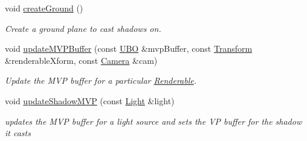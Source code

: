 \begin{DoxyCompactItemize}
\mbox{\label{class_vk_app_ab1b583e2a575aabcdb36e34d620a59ac}} 
void \mbox{\hyperlink{class_vk_app_ab1b583e2a575aabcdb36e34d620a59ac}{create\+Ground}} ()
\begin{DoxyCompactList}\small\item\em Create a ground plane to cast shadows on. \end{DoxyCompactList}\item 
void \mbox{\hyperlink{class_vk_app_a3ff7e92225ca0400b637c64082fcdfc9}{update\+M\+V\+P\+Buffer}} (const \mbox{\hyperlink{struct_u_b_o}{U\+BO}} \&mvp\+Buffer, const \mbox{\hyperlink{class_transform}{Transform}} \&renderable\+Xform, const \mbox{\hyperlink{class_camera}{Camera}} \&cam)
\begin{DoxyCompactList}\small\item\em Update the M\+VP buffer for a particular \mbox{\hyperlink{class_renderable}{Renderable}}. \end{DoxyCompactList}\item 
void \mbox{\hyperlink{class_vk_app_a0aade43db97056560fa3bc869423d1cc}{update\+Shadow\+M\+VP}} (const \mbox{\hyperlink{struct_light}{Light}} \&light)
\begin{DoxyCompactList}\small\item\em updates the M\+VP buffer for a light source and sets the VP buffer for the shadow it casts \end{DoxyCompactList}\end{DoxyCompactItemize}
